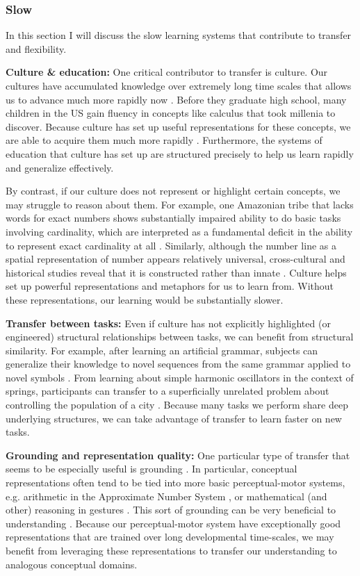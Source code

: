 \documentclass[11pt]{article}
\begin{document}
\subsubsection{Slow}
In this section I will discuss the slow learning systems that contribute to transfer and flexibility. \par
\textbf{Culture \& education:} One critical contributor to transfer is culture. Our cultures have accumulated knowledge over extremely long time scales that allows us to advance much more rapidly now \citep{Tomasello1993, Bengio2012}. Before they graduate high school, many children in the US gain fluency in concepts like calculus that took millenia to discover. Because culture has set up useful representations for these concepts, we are able to acquire them much more rapidly \citep[e.g.]{McClelland2016}. Furthermore, the systems of education that culture has set up are structured precisely to help us learn rapidly and generalize effectively. \par 
By contrast, if our culture does not represent or highlight certain concepts, we may struggle to reason about them. For example, one Amazonian tribe that lacks words for exact numbers shows substantially impaired ability to do basic tasks involving cardinality, which are interpreted as a fundamental deficit in the ability to represent exact cardinality at all \citep{Gordon2004}. Similarly, although the number line as a spatial representation of number appears relatively universal, cross-cultural and historical studies reveal that it is constructed rather than innate \citep{Nunez2011}. Culture helps set up powerful representations and metaphors for us to learn from. Without these representations, our learning would be substantially slower. \par 
\textbf{Transfer between tasks:} Even if culture has not explicitly highlighted (or engineered) structural relationships between tasks, we can benefit from structural similarity. For example, after learning an artificial grammar, subjects can generalize their knowledge to novel sequences from the same grammar applied to novel symbols \citep[e.g.]{Tunney2001}. From learning about simple harmonic oscillators in the context of springs, participants can transfer to a superficially unrelated problem about controlling the population of a city \citep[e.g.]{Day2011}. Because many tasks we perform share deep underlying structures, we can take advantage of transfer to learn faster on new tasks. \par 
\textbf{Grounding and representation quality:} One particular type of transfer that seems to be especially useful is grounding \citep{Barsalou2007}. In particular, conceptual representations often tend to be tied into more basic perceptual-motor systems, e.g. arithmetic in the Approximate Number System \citep{Park2013}, or mathematical (and other) reasoning in gestures \citep{Goldin-Meadow1993, Goldin-Meadow1999}. This sort of grounding can be very beneficial to understanding \citep{Nathan2008, Schwartz2015, Wakefield2018}. Because our perceptual-motor system have exceptionally good representations that are trained over long developmental time-scales, we may benefit from leveraging these representations to transfer our understanding to analogous conceptual domains. \par 
\end{document}

